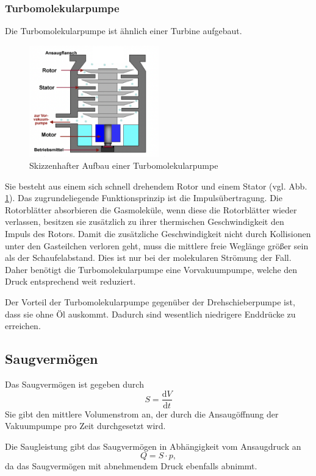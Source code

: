 \subsubsection{Turbomolekularpumpe}
Die Turbomolekularpumpe ist ähnlich einer Turbine aufgebaut.
\begin{figure}[h]
    \centering
    \includegraphics[width=0.5\textwidth]{abb/Turbopumpe.png}
    \caption{Skizzenhafter Aufbau einer Turbomolekularpumpe \cite{turbo}}
    \label{fig:turbo}
\end{figure}
Sie besteht aus einem sich schnell drehendem Rotor und einem Stator (vgl. Abb. \ref{fig:turbo}).
Das zugrundeliegende Funktionsprinzip ist die Impulsübertragung.
Die Rotorblätter absorbieren die Gasmoleküle, 
wenn diese die Rotorblätter wieder verlassen, besitzen sie zusätzlich zu ihrer thermischen Geschwindigkeit den Impuls des Rotors.
Damit die zusätzliche Geschwindigkeit nicht durch Kollisionen unter den Gasteilchen verloren geht,
muss die mittlere freie Weglänge größer sein als der Schaufelabstand.
Dies ist nur bei der molekularen Strömung der Fall.
Daher benötigt die Turbomolekularpumpe eine Vorvakuumpumpe,
welche den Druck entsprechend weit reduziert.

Der Vorteil der Turbomolekularpumpe gegenüber der Drehschieberpumpe ist,
dass sie ohne Öl auskommt.
Dadurch sind wesentlich niedrigere Enddrücke zu erreichen.


\subsection{Saugvermögen}
Das Saugvermögen ist gegeben durch 
\begin{equation}
    S =\frac{\text{d}V}{\text{d}t}
\end{equation}
Sie gibt den mittlere Volumenstrom an,
der durch die Ansaugöffnung der Vakuumpumpe pro Zeit durchgesetzt wird.

Die Saugleistung gibt das Saugvermögen in Abhängigkeit vom Ansaugdruck an
\begin{equation}
    Q = S\cdot p,
    \label{eq:leckQ}
\end{equation}
da das Saugvermögen mit abnehmendem Druck ebenfalls abnimmt.


